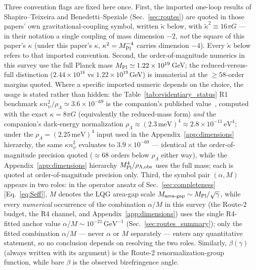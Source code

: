 \documentclass[aps,prd,twocolumn,superscriptaddress,showpacs,preprintnumbers,nofootinbib,longbibliography,floatfix]{revtex4-2}
\newcommand{\MPl}{M_{\rm Pl}}
\begin{document}
Three convention flags are fixed here once. First, the imported one-loop
results of Shapiro--Teixeira and Benedetti--Speziale
(Sec.~\ref{sec:routes}) are quoted in those papers' own
gravitational-coupling symbol, written $\tilde\kappa$ below, with
$\tilde\kappa^{2}\equiv16\pi G$ --- in their notation a single coupling of
mass dimension $-2$, \emph{not} the square of this paper's $\kappa$ (under
this paper's $\kappa$, $\kappa^{2}=\MPl^{-4}$ carries dimension $-4$).
Every $\tilde\kappa$ below refers to that imported convention. Second, the
order-of-magnitude numerics in this survey use the full Planck mass
$\MPl\simeq1.22\times10^{19}\,$GeV; the reduced-versus-full distinction
($2.44\times10^{18}$ vs $1.22\times10^{19}\,$GeV) is immaterial at the
$\geq 58$-order margins quoted. Where a specific imported numeric
depends on the choice, the usage is stated rather than hidden: the
Table~\ref{tab:evidentiary_status} R1 benchmark
$\kappa n_\psi^2/\rho_\Lambda\simeq3.6\times10^{-69}$ is the companion's
published value~\cite{Golden2026P1a}, computed with the exact
$\kappa=8\pi G$ (equivalently the reduced-mass form) \emph{and} the
companion's dark-energy normalization
$\rho_\Lambda\approx(2.3\,\text{meV})^4\approx2.8\times10^{-11}\,\text{eV}^4$;
under the $\rho_\Lambda=(2.25\,\text{meV})^4$ input used in the
Appendix~\ref{app:dimensions} hierarchy, the same $\kappa n_\psi^2$
evaluates to $3.9\times10^{-69}$ --- identical at the order-of-magnitude
precision quoted (${\approx}68$ orders below $\rho_\Lambda$ either way),
while
the Appendix~\ref{app:dimensions} hierarchy $\MPl^4/\rho_{\Lambda,\rm obs}$
uses the full mass; each is quoted at order-of-magnitude precision
only. Third, the symbol pair $(\alpha,M)$
appears in two roles: in the operator ansatz of
Sec.~\ref{sec:completeness} [Eq.~\eqref{eq:Seff}], $M$ denotes the LQG
area-gap scale $M_{\rm area\text{-}gap}\sim\MPl/\sqrt{\gamma}$, while
every \emph{numerical} occurrence of the combination $\alpha/M$ in this
survey (the Route-2 budget, the R4 channel, and
Appendix~\ref{app:dimensions}) uses the single R4-fitted anchor value
$\alpha/M\sim10^{-21}\,\text{GeV}^{-1}$
(Sec.~\ref{sec:routes_summary}); only the fitted combination $\alpha/M$
--- never $\alpha$ or $M$ separately --- enters any quantitative
statement, so no conclusion depends on resolving the two roles.
Similarly, $\beta(\gamma)$ (always written with its argument) is the
Route-2 renormalization-group function, while bare $\beta$ is the
observed birefringence angle.
\end{document}

